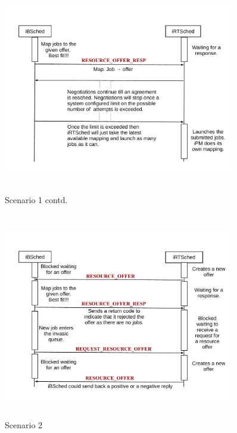 \begin{figure}[!t]
\vspace{-0.25in}
\centering
\includegraphics[width=0.9\textwidth, height=90mm]{./figures/scenario1contd.pdf}
\caption{Scenario 1 contd.}
\label{fig:Seq1}
\end{figure}
\begin{figure}[!b]
\centering
\includegraphics[width=0.9\textwidth, height=90mm]{./figures/scenario2.pdf}
\caption{Scenario 2}
\label{fig:Seq2}
\end{figure}
